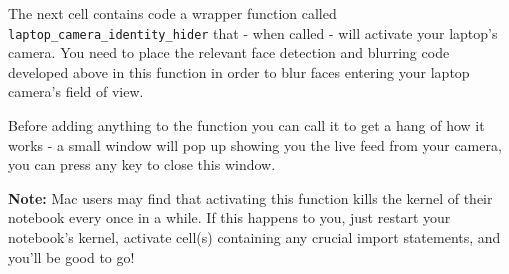 \documentclass[11pt]{article}
\begin{document}
The next cell contains code a wrapper function called
\texttt{laptop\_camera\_identity\_hider} that - when called - will
activate your laptop's camera. You need to place the relevant face
detection and blurring code developed above in this function in order to
blur faces entering your laptop camera's field of view.

Before adding anything to the function you can call it to get a hang of
how it works - a small window will pop up showing you the live feed from
your camera, you can press any key to close this window.

\textbf{Note:} Mac users may find that activating this function kills
the kernel of their notebook every once in a while. If this happens to
you, just restart your notebook's kernel, activate cell(s) containing
any crucial import statements, and you'll be good to go!
\end{document}
